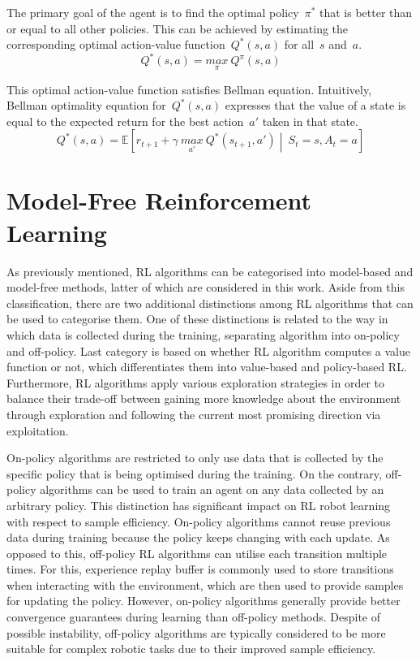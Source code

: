 The primary goal of the agent is to find the optimal policy~\(\pi^{*}\) that is better than or equal to all other policies. This can be achieved by estimating the corresponding optimal action-value function~\(Q^{*}(s, a)\) for all~\(s\) and~\(a\).
\begin{equation}
    Q^{*}(s, a) = \underset{\pi}{max}\ Q^{\pi}(s, a)
    \label{eq:optimal_action_value_function}
\end{equation}

This optimal action-value function satisfies Bellman equation. Intuitively, Bellman optimality equation for~\(Q^{*}(s, a)\) expresses that the value of a state is equal to the expected return for the best action~\(a'\) taken in that state.
\begin{equation}
    Q^{*}(s, a) = \mathbb{E} \left[ r_{t+1} + \gamma\ \underset{a'}{max}\ Q^{*}(s_{t+1}, a') \middle\vert\ S_{t}{=}s, A_{t}{=}a \right]
\end{equation}


\section{Model-Free Reinforcement Learning}

As previously mentioned, RL algorithms can be categorised into model-based and model-free methods, latter of which are considered in this work. Aside from this classification, there are two additional distinctions among RL algorithms that can be used to categorise them. One of these distinctions is related to the way in which data is collected during the training, separating algorithm into on-policy and off-policy. Last category is based on whether RL algorithm computes a value function or not, which differentiates them into value-based and policy-based RL. Furthermore, RL algorithms apply various exploration strategies in order to balance their trade-off between gaining more knowledge about the environment through exploration and following the current most promising direction via exploitation.

On-policy algorithms are restricted to only use data that is collected by the specific policy that is being optimised during the training. On the contrary, off-policy algorithms can be used to train an agent on any data collected by an arbitrary policy. This distinction has significant impact on RL robot learning with respect to sample efficiency. On-policy algorithms cannot reuse previous data during training because the policy keeps changing with each update. As opposed to this, off-policy RL algorithms can utilise each transition multiple times. For this, experience replay buffer \cite{mnih_human-level_2015} is commonly used to store transitions when interacting with the environment, which are then used to provide samples for updating the policy. However, on-policy algorithms generally provide better convergence guarantees during learning than off-policy methods. Despite of possible instability, off-policy algorithms are typically considered to be more suitable for complex robotic tasks due to their improved sample efficiency.


